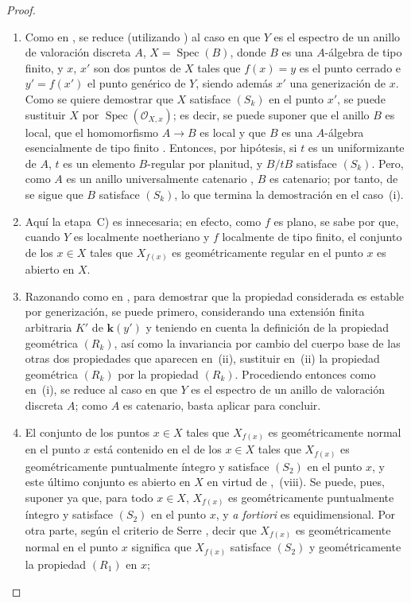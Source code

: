\begin{proof}
\begin{enumerate}[label=(\roman*)]
  \item[(i)] Como en , se reduce (utilizando ) al caso en que $Y$ es el espectro de un anillo de valoración discreta $A$, $X=\operatorname{Spec}(B)$, donde $B$ es una $A$-álgebra de tipo finito, y $x$,
  $x'$ son dos puntos de $X$ tales que $f(x)=y$ es el punto cerrado e $y'=f(x')$ el punto genérico de $Y$, siendo además $x'$ una generización de $x$.
Como se quiere demostrar que $X$ satisface $(S_k)$ en el punto $x'$, se puede sustituir $X$ por $\operatorname{Spec}(\mathcal O_{X,x})$; es decir, se puede suponer que el anillo $B$ es local, que el homomorfismo $A\to B$ es local y que $B$ es una $A$-álgebra esencialmente de tipo finito .
Entonces, por hipótesis, si $t$ es un uniformizante de $A$, $t$ es un elemento $B$-regular por planitud, y $B/tB$ satisface $(S_k)$.
Pero, como $A$ es un anillo universalmente catenario , $B$ es catenario; por tanto, de  se sigue que $B$ satisface $(S_k)$, lo que termina la demostración en el caso~(i).

  \item[(iii)] Aquí la etapa~C) es innecesaria; en efecto, como $f$ es plano, se sabe por  que, cuando $Y$ es localmente noetheriano y $f$ localmente de tipo finito, el conjunto de los $x\in X$ tales que $X_{f(x)}$ es geométricamente regular en el punto $x$ es abierto en $X$.

  \item[(ii)] Razonando como en , para demostrar que la propiedad considerada es estable por generización, se puede primero, considerando una extensión finita arbitraria $K'$ de $\boldsymbol{k}(y')$ y teniendo en cuenta la definición  de la propiedad geométrica $(R_k)$, así como la invariancia por cambio del cuerpo base de las otras dos propiedades que aparecen en~(ii), sustituir en~(ii) la propiedad geométrica $(R_k)$ por la propiedad $(R_k)$.
Procediendo entonces como en~(i), se reduce al caso en que $Y$ es el espectro de un anillo de valoración discreta $A$; como $A$ es catenario, basta aplicar  para concluir.

  \item[(iv)] El conjunto de los puntos $x\in X$ tales que $X_{f(x)}$ es geométricamente normal en el punto $x$ está contenido en el de los $x\in X$ tales que $X_{f(x)}$ es geométricamente puntualmente íntegro y satisface $(S_2)$ en el punto $x$, y este último conjunto es abierto en $X$ en virtud de ,~(viii).
Se puede, pues, suponer ya que, para todo $x\in X$, $X_{f(x)}$ es geométricamente puntualmente íntegro y satisface $(S_2)$ en el punto $x$, y \emph{a fortiori} es equidimensional.
Por otra parte, según el criterio de Serre , decir que $X_{f(x)}$ es geométricamente normal en el punto $x$ significa que $X_{f(x)}$ satisface $(S_2)$ y geométricamente la propiedad $(R_1)$ en $x$;





\end{enumerate}
\end{proof}
